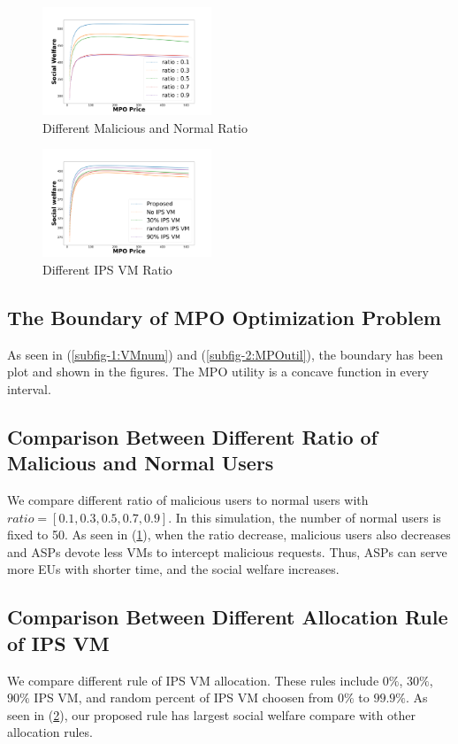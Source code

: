 \documentclass[conference]{IEEEtran}
\begin{document}
    \begin{figure}
      \includegraphics[width=0.45\textwidth]{5GDDoS_Game_utility_ratio.pdf}
        \caption{Different Malicious and Normal Ratio}
    \label{subfig-1:ratio}
    \end{figure}
    
    \begin{figure}
      \includegraphics[width=0.45\textwidth]{5GDDoS_Game_utility_cmp.pdf}
    \caption{Different IPS VM Ratio}
    \label{subfig-2:cmp}
    \end{figure}
    

\subsection{The Boundary of MPO Optimization Problem}
\label{MPO_opti}
As seen in (\ref{subfig-1:VMnum}) and (\ref{subfig-2:MPOutil}), the boundary has been plot and shown in the figures. The MPO utility is a concave function in every interval. 
\subsection{Comparison Between Different Ratio of Malicious and Normal Users}
We compare different ratio of malicious users to normal users with $ratio = [0.1, 0.3, 0.5, 0.7, 0.9]$. In this simulation, the number of normal users is fixed to 50. As seen in (\ref{subfig-1:ratio}), when the ratio decrease, malicious users also decreases and ASPs devote less VMs to intercept malicious requests. Thus, ASPs can serve more EUs with shorter time, and the social welfare increases.
\label{mal_ratio}
\subsection{Comparison Between Different Allocation Rule of IPS VM}
\label{MPO_cmp}
We compare different rule of IPS VM allocation. These rules include $0\%$, $30\%$, $90\%$ IPS VM, and random percent of IPS VM choosen from $0\% $ to $99.9\%$. As seen in (\ref{subfig-2:cmp}), our proposed rule has largest social welfare compare with other allocation rules.


\end{document}
